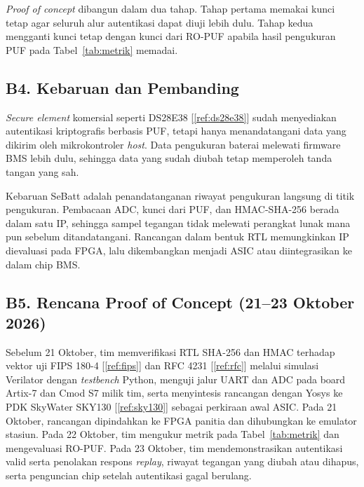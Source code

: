 \documentclass[11pt,a4paper]{article}
\newcommand{\rujuk}[1]{[\ref{#1}]}   %
\begin{document}
\textit{Proof of concept} dibangun dalam dua tahap. Tahap pertama memakai kunci tetap agar seluruh alur autentikasi dapat diuji lebih dulu. Tahap kedua mengganti kunci tetap dengan kunci dari RO-PUF apabila hasil pengukuran PUF pada Tabel~\ref{tab:metrik} memadai.

\subsection{B4. Kebaruan dan Pembanding}

\textit{Secure element} komersial seperti DS28E38 \rujuk{ref:ds28e38} sudah menyediakan autentikasi kriptografis berbasis PUF, tetapi hanya menandatangani data yang dikirim oleh mikrokontroler \textit{host}. Data pengukuran baterai melewati firmware BMS lebih dulu, sehingga data yang sudah diubah tetap memperoleh tanda tangan yang sah.

Kebaruan SeBatt adalah penandatanganan riwayat pengukuran langsung di titik pengukuran. Pembacaan ADC, kunci dari PUF, dan HMAC-SHA-256 berada dalam satu IP, sehingga sampel tegangan tidak melewati perangkat lunak mana pun sebelum ditandatangani. Rancangan dalam bentuk RTL memungkinkan IP dievaluasi pada FPGA, lalu dikembangkan menjadi ASIC atau diintegrasikan ke dalam chip BMS.

\subsection{B5. Rencana Proof of Concept (21--23 Oktober 2026)}

Sebelum 21 Oktober, tim memverifikasi RTL SHA-256 dan HMAC terhadap vektor uji FIPS 180-4 \rujuk{ref:fips} dan RFC 4231 \rujuk{ref:rfc} melalui simulasi Verilator dengan \textit{testbench} Python, menguji jalur UART dan ADC pada board Artix-7 dan Cmod S7 milik tim, serta menyintesis rancangan dengan Yosys ke PDK SkyWater SKY130 \rujuk{ref:sky130} sebagai perkiraan awal ASIC. Pada 21 Oktober, rancangan dipindahkan ke FPGA panitia dan dihubungkan ke emulator stasiun. Pada 22 Oktober, tim mengukur metrik pada Tabel~\ref{tab:metrik} dan mengevaluasi RO-PUF. Pada 23 Oktober, tim mendemonstrasikan autentikasi valid serta penolakan respons \textit{replay}, riwayat tegangan yang diubah atau dihapus, serta penguncian chip setelah autentikasi gagal berulang.
\end{document}
